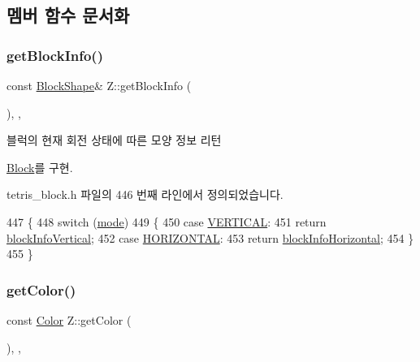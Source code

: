 \subsection{멤버 함수 문서화}
\mbox{\label{class_z_a95cca7076b1d1744d099f2a7db67fbf1}} 
\subsubsection{\texorpdfstring{get\+Block\+Info()}{getBlockInfo()}}
{\footnotesize\ttfamily const \mbox{\hyperlink{class_block_aca5d951639f113e2ebd7856209d6b9ab}{Block\+Shape}}\& Z\+::get\+Block\+Info (\begin{DoxyParamCaption}{ }\end{DoxyParamCaption})\hspace{0.3cm}{\ttfamily [inline]}, {\ttfamily [override]}, {\ttfamily [virtual]}}



블럭의 현재 회전 상태에 따른 모양 정보 리턴 



\mbox{\hyperlink{class_block_a2cdc0af223d621add42ac6c37fede329}{Block}}를 구현.



tetris\+\_\+block.\+h 파일의 446 번째 라인에서 정의되었습니다.


\begin{DoxyCode}
447     \{
448         \textcolor{keywordflow}{switch} (\mbox{\hyperlink{class_z_a8324fb6e9f23196a9649ab838aabcc74}{mode}})
449         \{
450         \textcolor{keywordflow}{case} \mbox{\hyperlink{class_block_a33a96023993478ad4b52426188454765a76628d7877667ccb2f6e549b89466a4a}{VERTICAL}}:
451             \textcolor{keywordflow}{return} \mbox{\hyperlink{class_z_abf77b0c1e705c62c51396f55579a8fa3}{blockInfoVertical}};
452         \textcolor{keywordflow}{case} \mbox{\hyperlink{class_block_a33a96023993478ad4b52426188454765a883bda1b4a0cb6d25d8b3c3465f0cfef}{HORIZONTAL}}:
453             \textcolor{keywordflow}{return} \mbox{\hyperlink{class_z_a2e59d23428e1ad155832c0f5a118e25e}{blockInfoHorizontal}};
454         \}
455     \}
\end{DoxyCode}
\mbox{\label{class_z_a75f1e882dd5fb52b23bbd691da1e306e}} 
\subsubsection{\texorpdfstring{get\+Color()}{getColor()}}
{\footnotesize\ttfamily const \mbox{\hyperlink{class_block_ad054b4ac51df79aa910040b2a2fdf7b5}{Color}} Z\+::get\+Color (\begin{DoxyParamCaption}{ }\end{DoxyParamCaption})\hspace{0.3cm}{\ttfamily [inline]}, {\ttfamily [override]}, {\ttfamily [virtual]}}



